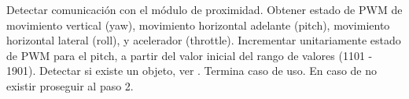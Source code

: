 
\begin{UCtrayectoria}
	\UCpaso [\UCactor] Detectar comunicación con el módulo de proximidad.
	\UCpaso Obtener estado de PWM de movimiento vertical (yaw), movimiento 
	horizontal adelante (pitch), movimiento horizontal lateral (roll), 
	y acelerador (throttle).
	\UCpaso Incrementar unitariamente estado de PWM para el pitch, a partir 
	del valor inicial del rango de valores (1101 - 1901).
	\UCpaso Detectar si existe un objeto, ver . Termina 
	caso de uso. En caso de no existir proseguir al paso 2.
\end{UCtrayectoria}








